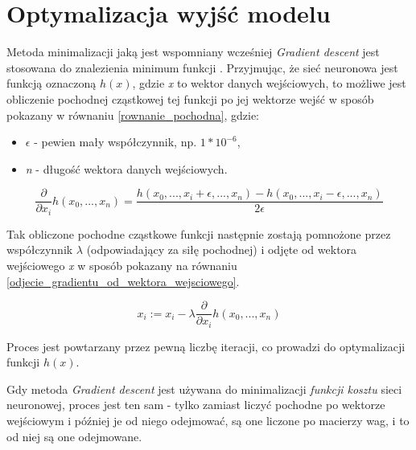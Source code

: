 \documentclass[12pt]{aghdpl}
\begin{document}
		\section{Optymalizacja wyjść modelu} \label{optymalizacja_wyjsc_modelu}
		Metoda minimalizacji jaką jest wspomniany wcześniej \textit{Gradient descent} jest stosowana do znalezienia minimum funkcji \cite{cost_function_and_gradient_descent}. Przyjmując, że sieć neuronowa jest funkcją oznaczoną $h(x)$, gdzie \textit{x} to wektor danych wejściowych, to możliwe jest obliczenie pochodnej cząstkowej \cite{pochodna_czastkowa} tej funkcji po jej wektorze wejść w sposób pokazany w równaniu \ref{rownanie_pochodna}, gdzie:
		\begin{itemize}
		\item $\epsilon$ - pewien mały współczynnik, np. $1 * 10^{-6}$,
		\item \textit{n} - długość wektora danych wejściowych.
		\end{itemize}
		
		\begin{equation} \label{rownanie_pochodna}
		\frac{\partial}{\partial x_i}h(x_0, ..., x_n) 
		  = \frac{h(x_0, ..., x_i + \epsilon, ..., x_n) 
		  		  - h(x_0, ..., x_i - \epsilon, ..., x_n)}
			{2 \epsilon}
		\end{equation}
		
		Tak obliczone pochodne cząstkowe funkcji następnie zostają pomnożone przez współczynnik $\lambda$ (odpowiadający za siłę pochodnej) i odjęte od wektora wejściowego \textit{x} w sposób pokazany na równaniu \ref{odjecie_gradientu_od_wektora_wejsciowego}.
		
		\begin{equation} \label{odjecie_gradientu_od_wektora_wejsciowego}
		x_i := x_i - \lambda \frac{\partial}{\partial x_i}h(x_0, ..., x_n)
		\end{equation}
		
		Proces jest powtarzany przez pewną liczbę iteracji, co prowadzi do optymalizacji funkcji $h(x)$.
		
		Gdy metoda \textit{Gradient descent} jest używana do minimalizacji \textit{funkcji kosztu} sieci neuronowej, proces jest ten sam - tylko zamiast liczyć pochodne po wektorze wejściowym i później je od niego odejmować, są one liczone po macierzy wag, i to od niej są one odejmowane.
			
\end{document}
